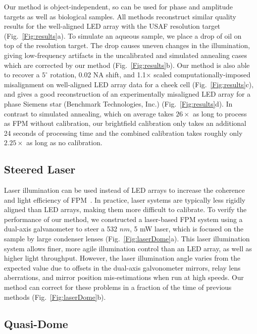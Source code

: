 Our method is object-independent, so can be used for phase and amplitude targets as well as biological samples. All methods reconstruct similar quality results for the well-aligned LED array with the USAF resolution target (Fig.~\ref{Fig:results}a). To simulate an aqueous sample, we place a drop of oil on top of the resolution target. The drop causes uneven changes in the illumination, giving low-frequency artifacts in the uncalibrated and simulated annealing cases which are corrected by our method (Fig.~\ref{Fig:results}b). Our method is also able to recover a $5^{\circ}$ rotation, 0.02 NA shift, and 1.1$\times$ scaled computationally-imposed misalignment on well-aligned LED array data for a cheek cell (Fig.~\ref{Fig:results}c), and gives a good reconstruction of an experimentally misaligned LED array for a phase Siemens star (Benchmark Technologies, Inc.) (Fig.~\ref{Fig:results}d). In contrast to simulated annealing, which on average takes $26 \times$ as long to process as FPM without calibration, our brightfield calibration only takes an additional 24 seconds of processing time and the combined calibration takes roughly only $2.25 \times$ as long as no calibration.

\subsection{Steered Laser}
Laser illumination can be used instead of LED arrays to increase the coherence and light efficiency of FPM~\cite{Kuang:15,Chung2016}. In practice, laser systems are typically less rigidly aligned than LED arrays, making them more difficult to calibrate. To verify the performance of our method, we constructed a laser-based FPM system using a dual-axis galvanometer to steer a 532 $nm$, 5 mW laser, which is focused on the sample by large condenser lenses (Fig.~\ref{Fig:laserDome}a). This laser illumination system allows finer, more agile illumination control than an LED array, as well as higher light throughput. However, the laser illumination angle varies from the expected value due to offsets in the dual-axis galvonometer mirrors, relay lens aberrations, and mirror position mis-estimations when run at high speeds. Our method can correct for these problems in a fraction of the time of previous methods (Fig.~\ref{Fig:laserDome}b). 

\subsection{Quasi-Dome}

